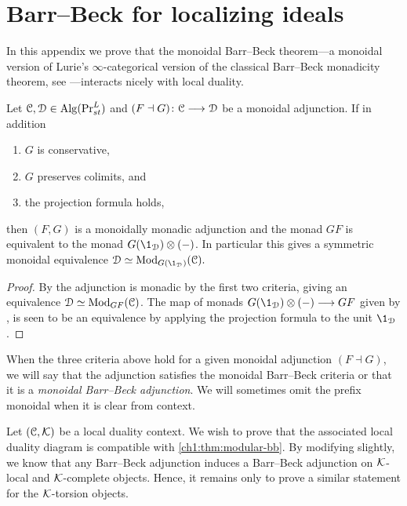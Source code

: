

\section{Barr--Beck for localizing ideals}
\label{ch1:app:barr-beck}

In this appendix we prove that the monoidal Barr--Beck theorem---a monoidal version of Lurie's $\infty$-categorical version of the classical Barr--Beck monadicity theorem, see \cite[Section 4.7]{Lurie_HA}---interacts nicely with local duality.

\begin{theorem}
    \label{ch1:thm:modular-bb}
    Let $\EuScript{C}, \EuScript{D} \in \operatorname{Alg}(\mathrm{Pr}_{st}^L)$ and $(F\dashv G)\colon \EuScript{C}\longrightarrow \EuScript{D}$ be a monoidal adjunction. If in addition 
    \begin{enumerate}
        \item $G$ is conservative, 
        \item $G$ preserves colimits, and
        \item the projection formula holds,
    \end{enumerate}
    then $(F,G)$ is a monoidally monadic adjunction and the monad $GF$ is equivalent to the monad $G(\1_\D)\otimes (-)$. In particular this gives a symmetric monoidal equivalence $\D\simeq \Mod_{G(\1_\D)}(\C).$
\end{theorem}
\begin{proof}
    By \cite[4.7.3.5]{Lurie_HA} the adjunction is monadic by the first two criteria, giving an equivalence $\EuScript{D}\simeq \mathrm{Mod}_{GF}(\EuScript{C})$. The map of monads $G(\1_\D)\otimes (-)\to GF$ given by \cite[3.6]{elmanto-kolderup_2020}, is seen to be an equivalence by applying the projection formula to the unit $\1_\D$. 
\end{proof}

\begin{definition}
    When the three criteria above hold for a given monoidal adjunction $(F\dashv G)$, we will say that the adjunction satisfies the monoidal Barr--Beck criteria or that it is a \emph{monoidal Barr--Beck adjunction}. We will sometimes omit the prefix monoidal when it is clear from context. 
\end{definition}

Let $(\EuScript{C}, \mathcal{K})$ be a local duality context. We wish to prove that the associated local duality diagram is compatible with \cref{ch1:thm:modular-bb}. By modifying \cite[3.7]{behrens-shaw_2020} slightly, we know that any Barr--Beck adjunction induces a Barr--Beck adjunction on $\mathcal{K}$-local and $\mathcal{K}$-complete objects. Hence, it remains only to prove a similar statement for the $\mathcal{K}$-torsion objects. 

